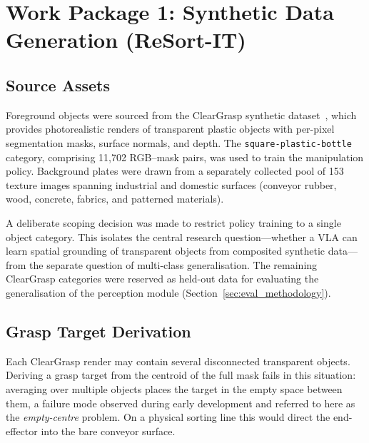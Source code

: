 \section{Work Package 1: Synthetic Data Generation (ReSort-IT)}
\label{sec:wp1}

\subsection{Source Assets}
\label{subsec:source_assets}

Foreground objects were sourced from the ClearGrasp synthetic dataset~\citep{sajjan2020}, which provides photorealistic renders of transparent plastic objects with per-pixel segmentation masks, surface normals, and depth. The \texttt{square-plastic-bottle} category, comprising 11{,}702 RGB--mask pairs, was used to train the manipulation policy. Background plates were drawn from a separately collected pool of 153 texture images spanning industrial and domestic surfaces (conveyor rubber, wood, concrete, fabrics, and patterned materials).

A deliberate scoping decision was made to restrict policy training to a single object category. This isolates the central research question---whether a VLA can learn spatial grounding of transparent objects from composited synthetic data---from the separate question of multi-class generalisation. The remaining ClearGrasp categories were reserved as held-out data for evaluating the generalisation of the perception module (Section~\ref{sec:eval_methodology}).

\subsection{Grasp Target Derivation}
\label{subsec:target_derivation}

Each ClearGrasp render may contain several disconnected transparent objects. Deriving a grasp target from the centroid of the full mask fails in this situation: averaging over multiple objects places the target in the empty space between them, a failure mode observed during early development and referred to here as the \emph{empty-centre} problem. On a physical sorting line this would direct the end-effector into the bare conveyor surface.

